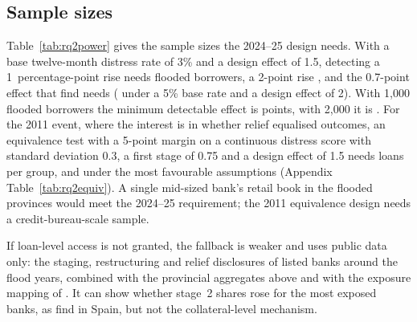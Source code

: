 \subsection{Sample sizes}

\begin{table}[t]
\centering\footnotesize
\caption{Flooded borrowers needed to detect a flood effect on distress, 2024--25 design}\label{tab:rq2power}

\end{table}

Table~\ref{tab:rq2power} gives the sample sizes the 2024--25 design needs. With a base twelve-month distress rate of 3\% and a design effect of 1.5, detecting a 1~percentage-point rise needs \rqTwoNeedOne{} flooded borrowers, a 2-point rise \rqTwoNeedTwo, and the 0.7-point effect that \citet{albertazzi2026physical} find needs \rqTwoNeedLow{} (\rqTwoNeedLowPess{} under a 5\% base rate and a design effect of 2). With 1,000 flooded borrowers the minimum detectable effect is \rqTwoMdeThousand{} points, with 2,000 it is \rqTwoMdeTwoThousand. For the 2011 event, where the interest is in whether relief equalised outcomes, an equivalence test with a 5-point margin on a continuous distress score with standard deviation 0.3, a first stage of 0.75 and a design effect of 1.5 needs \rqTwoEquivN{} loans per group, and \rqTwoEquivNBest{} under the most favourable assumptions (Appendix Table~\ref{tab:rq2equiv}). A single mid-sized bank's retail book in the flooded provinces would meet the 2024--25 requirement; the 2011 equivalence design needs a credit-bureau-scale sample.

If loan-level access is not granted, the fallback is weaker and uses public data only: the staging, restructuring and relief disclosures of listed banks around the flood years, combined with the provincial aggregates above and with the exposure mapping of \citet{worldbank2026ccdrfin}. It can show whether stage~2 shares rose for the most exposed banks, as \citet{perezmontes2025impact} find in Spain, but not the collateral-level mechanism.
